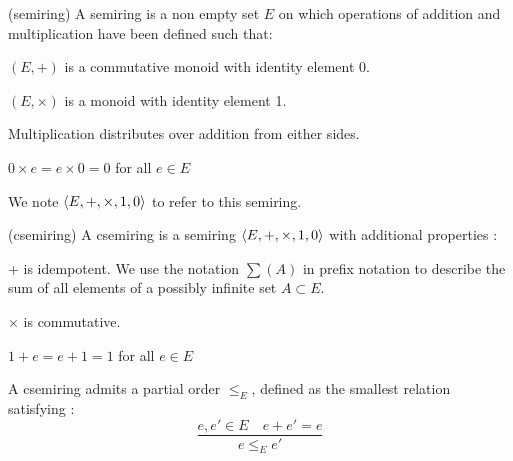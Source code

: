 \begin{definition} (semiring)
	A semiring is a non empty set $E$ on which operations of addition and multiplication have been defined such that:
	\begin{list}{-}{ }
		\item $(E,+)$ is a commutative monoid with identity element 0.
		\item $(E,\times)$ is a monoid with identity element 1.
		\item Multiplication distributes over addition from either sides.
		\item $0 \times e = e \times 0 = 0$ for all $ e \in E$
	\end{list} 
	We note $\left\langle E, +, \times, \boldmath{1},\boldmath{0} \right\rangle$ to refer to this semiring.
\end{definition}

\begin{definition} (csemiring)
	A csemiring is a semiring  $\left\langle E, +, \times, \boldmath{1},\boldmath{0} \right\rangle$ with additional properties :
	\begin{list}{-}{ }
		\item + is idempotent. We use the notation $\sum(A)$ in prefix notation to describe the sum of all elements of a possibly infinite set $A \subset E$.
		\item $\times$ is commutative.
		\item $1 + e = e + 1 = 1$ for all $ e \in E$
	\end{list} 
	A csemiring admits a partial order $\leq_{E}$, defined as the smallest relation satisfying :
	$$
	\frac{e,e' \in E \quad e+e' = e}{e \leq_{E} e'}
	$$
\end{definition}

